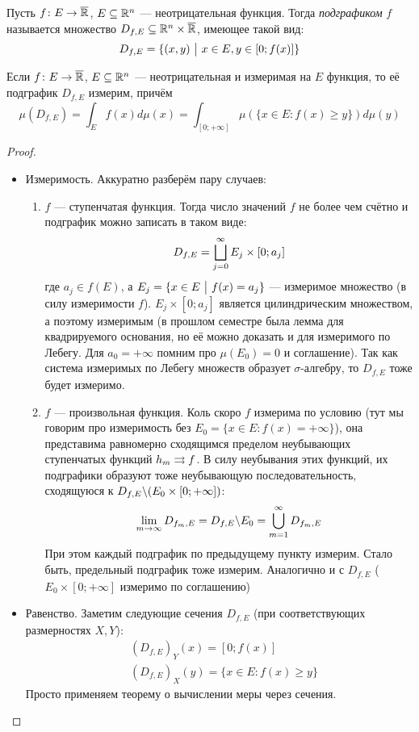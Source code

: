 \begin{definition}
	Пусть $f \colon E \to \overline{\mathbb{R}}$, $E \subseteq \mathbb{R}^n$ --- неотрицательная функция. Тогда \textit{подграфиком} $f$ называется множество $D_{f, E} \subseteq \mathbb{R}^n \times \overline{\mathbb{R}}$, имеющее такой вид:
	\[
		D_{f, E} = \{(x, y) \ \big|\  x \in E, y \in [0; f(x)]\}
	\]
\end{definition}

\begin{lemma}
	Если $f \colon E \to \overline{\mathbb{R}}$, $E \subseteq \mathbb{R}^n$ --- неотрицательная и измеримая на $E$ функция, то её подграфик $D_{f, E}$ измерим, причём
	\[
		\mu(D_{f, E}) = \int_E f(x)d\mu(x) = \int_{[0; +\infty]} \mu(\{x \in E \colon f(x) \ge y\})d\mu(y)
	\]
\end{lemma}

\begin{proof}
	\begin{itemize}
		\item Измеримость. Аккуратно разберём пару случаев:
		\begin{enumerate}
			\item $f$ --- ступенчатая функция. Тогда число значений $f$ не более чем счётно и подграфик можно записать в таком виде:
			\[
			D_{f, E} = \bigsqcup_{j = 0}^\infty E_j \times [0; a_j]
			\]
			где $a_j \in f(E)$, а $E_j = \{x \in E \ \big|\  f(x) = a_j\}$ --- измеримое множество (в силу измеримости $f$). $E_j \times [0; a_j]$ является цилиндрическим множеством, а поэтому измеримым (в прошлом семестре была лемма для квадрируемого основания, но её можно доказать и для измеримого по Лебегу. Для $a_0 = +\infty$ помним про $\mu(E_0) = 0$ и соглашение). Так как система измеримых по Лебегу множеств образует $\sigma$-алгебру, то $D_{f, E}$ тоже будет измеримо.
			
			\item $f$ --- произвольная функция. Коль скоро $f$ измерима по условию (тут мы говорим про измеримость без $E_0 = \{x \in E \colon f(x) = +\infty\}$), она представима равномерно сходящимся пределом неубывающих ступенчатых функций $h_m \rightrightarrows f$. В силу неубывания этих функций, их подграфики образуют тоже неубывающую последовательность, сходящуюся к $D_{f, E} \backslash (E_0 \times [0; +\infty])$:
			\[
				\lim_{m \to \infty} D_{f_m, E} = D_{f, E} \backslash E_0 = \bigcup_{m = 1}^\infty D_{f_m, E}
			\]
			При этом каждый подграфик по предыдущему пункту измерим. Стало быть, предельный подграфик тоже измерим. Аналогично и с $D_{f, E}$ ($E_0 \times [0; +\infty]$ измеримо по соглашению)
		\end{enumerate}
	
		\item Равенство. Заметим следующие сечения $D_{f, E}$ (при соответствующих размерностях $X, Y$):
		\begin{align*}
			&{(D_{f, E})_Y(x) = [0; f(x)]}
			\\
			&{(D_{f, E})_X(y) = \{x \in E \colon f(x) \ge y\}}
		\end{align*}
		Просто применяем теорему о вычислении меры через сечения.
	\end{itemize}
\end{proof}

